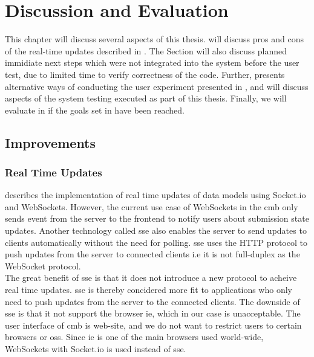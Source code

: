 \chapter{Discussion and Evaluation}
\label{ch:evaluation}
This chapter will discuss several aspects of this thesis.  will discuss pros and cons of the real-time updates described in . The Section will also discuss planned immidiate next steps which were not integrated into the system before the user test, due to limited time to verify correctness of the code. Further,  presents alternative ways of conducting the user experiment presented in , and  will discuss aspects of the system testing executed as part of this thesis. Finally, we will evaluate in  if the goals set in  have been reached.

\section{Improvements}
\label{sec:eval-tech}

\subsection{Real Time Updates}
 describes the implementation of real time updates of data models using Socket.io and WebSockets. However, the current use case of WebSockets in the \gls{cmb} only sends event from the server to the frontend to notify users about submission state updates. Another technology called \gls{sse} \cite{hickson2009} also enables the server to send updates to clients automatically without the need for polling. \gls{sse} uses the HTTP protocol to push updates from the server to connected clients i.e it is not full-duplex as the WebSocket protocol.  \\

The great benefit of \gls{sse} is that it does not introduce a new protocol to acheive real time updates. \gls{sse} is thereby concidered more fit to applications who only need to push updates from the server to the connected clients. The downside of \gls{sse} is that it not support the browser \gls{ie}, which in our case is unacceptable. The user interface of \gls{cmb} is web-site, and we do not want to restrict users to certain browsers or \glspl{os}. Since \gls{ie} is one of the main browsers used world-wide, WebSockets with Socket.io is used instead of \gls{sse}.  \\

